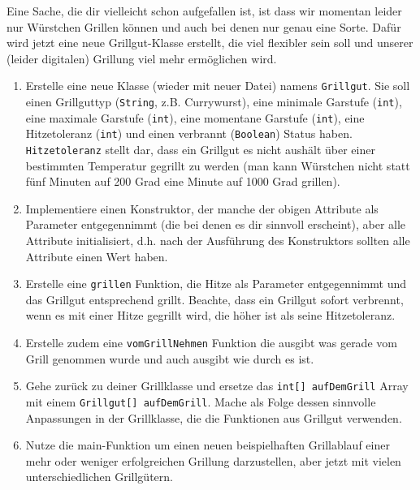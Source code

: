 \documentclass{../../sheet}
\begin{document}
\newpage
{}
Eine Sache, die dir vielleicht schon aufgefallen ist, ist dass wir momentan leider nur Würstchen Grillen können und auch bei denen nur genau eine Sorte. Dafür wird jetzt eine neue Grillgut-Klasse erstellt, die viel flexibler sein soll und unserer (leider digitalen) Grillung viel mehr ermöglichen wird.
\begin{enumerate}
    \item Erstelle eine neue Klasse (wieder mit neuer Datei) namens \texttt{Grillgut}. Sie soll einen Grillguttyp (\texttt{String}, z.B. Currywurst), eine minimale Garstufe (\texttt{int}), eine maximale Garstufe (\texttt{int}), eine momentane Garstufe (\texttt{int}), eine Hitzetoleranz (\texttt{int}) und einen verbrannt (\texttt{Boolean}) Status haben. \texttt{Hitzetoleranz} stellt dar, dass ein Grillgut es nicht aushält über einer bestimmten Temperatur gegrillt zu werden (man kann Würstchen nicht statt fünf Minuten auf 200 Grad eine Minute auf 1000 Grad grillen). 
    \item Implementiere einen Konstruktor, der manche der obigen Attribute als Parameter entgegennimmt (die bei denen es dir sinnvoll erscheint), aber alle Attribute initialisiert, d.h. nach der Ausführung des Konstruktors sollten alle Attribute einen Wert haben.
    \item Erstelle eine \texttt{grillen} Funktion, die Hitze als Parameter entgegennimmt und das Grillgut entsprechend grillt. Beachte, dass ein Grillgut sofort verbrennt, wenn es mit einer Hitze gegrillt wird, die höher ist als seine Hitzetoleranz.
    \item Erstelle zudem eine \texttt{vomGrillNehmen} Funktion die ausgibt was gerade vom Grill genommen wurde und auch ausgibt wie durch es ist.
    \item Gehe zurück zu deiner Grillklasse und ersetze das \texttt{int[] aufDemGrill} Array mit einem \texttt{Grillgut[] aufDemGrill}. Mache als Folge dessen sinnvolle Anpassungen in der Grillklasse, die die Funktionen aus Grillgut verwenden.
    \item Nutze die main-Funktion um einen neuen beispielhaften Grillablauf einer mehr oder weniger erfolgreichen
    Grillung darzustellen, aber jetzt mit vielen unterschiedlichen Grillgütern.
\end{enumerate}
\end{document}

